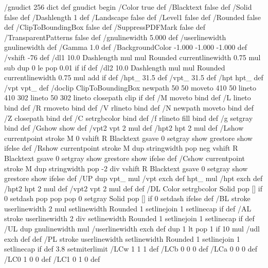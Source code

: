 /gnudict 256 dict def
gnudict begin
%
%
/Color true def
/Blacktext false def
/Solid false def
/Dashlength 1 def
/Landscape false def
/Level1 false def
/Rounded false def
/ClipToBoundingBox false def
/SuppressPDFMark false def
/TransparentPatterns false def
/gnulinewidth 5.000 def
/userlinewidth gnulinewidth def
/Gamma 1.0 def
/BackgroundColor {-1.000 -1.000 -1.000} def
%
/vshift -76 def
/dl1 {
  10.0 Dashlength mul mul
  Rounded { currentlinewidth 0.75 mul sub dup 0 le { pop 0.01 } if } if
} def
/dl2 {
  10.0 Dashlength mul mul
  Rounded { currentlinewidth 0.75 mul add } if
} def
/hpt_ 31.5 def
/vpt_ 31.5 def
/hpt hpt_ def
/vpt vpt_ def
/doclip {
  ClipToBoundingBox {
    newpath 50 50 moveto 410 50 lineto 410 302 lineto 50 302 lineto closepath
    clip
  } if
} def
%
%
%
/M {moveto} bind def
/L {lineto} bind def
/R {rmoveto} bind def
/V {rlineto} bind def
/N {newpath moveto} bind def
/Z {closepath} bind def
/C {setrgbcolor} bind def
/f {rlineto fill} bind def
/g {setgray} bind def
/Gshow {show} def   %
/vpt2 vpt 2 mul def
/hpt2 hpt 2 mul def
/Lshow {currentpoint stroke M 0 vshift R 
	Blacktext {gsave 0 setgray show grestore} {show} ifelse} def
/Rshow {currentpoint stroke M dup stringwidth pop neg vshift R
	Blacktext {gsave 0 setgray show grestore} {show} ifelse} def
/Cshow {currentpoint stroke M dup stringwidth pop -2 div vshift R 
	Blacktext {gsave 0 setgray show grestore} {show} ifelse} def
/UP {dup vpt_ mul /vpt exch def hpt_ mul /hpt exch def
  /hpt2 hpt 2 mul def /vpt2 vpt 2 mul def} def
/DL {Color {setrgbcolor Solid {pop []} if 0 setdash}
 {pop pop pop 0 setgray Solid {pop []} if 0 setdash} ifelse} def
/BL {stroke userlinewidth 2 mul setlinewidth
	Rounded {1 setlinejoin 1 setlinecap} if} def
/AL {stroke userlinewidth 2 div setlinewidth
	Rounded {1 setlinejoin 1 setlinecap} if} def
/UL {dup gnulinewidth mul /userlinewidth exch def
	dup 1 lt {pop 1} if 10 mul /udl exch def} def
/PL {stroke userlinewidth setlinewidth
	Rounded {1 setlinejoin 1 setlinecap} if} def
3.8 setmiterlimit
/LCw {1 1 1} def
/LCb {0 0 0} def
/LCa {0 0 0} def
/LC0 {1 0 0} def
/LC1 {0 1 0} def
